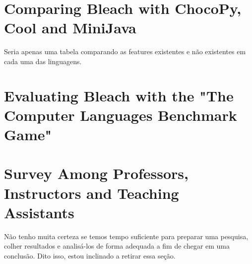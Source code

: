 \section{Comparing Bleach with ChocoPy, Cool and MiniJava}
Seria apenas uma tabela comparando as features existentes e não existentes em cada uma das linguagens.

\section{Evaluating Bleach with the "The Computer Languages Benchmark Game"}

\section{Survey Among Professors, Instructors and Teaching Assistants}
Não tenho muita certeza se temos tempo suficiente para preparar uma pesquisa, colher resultados e analisá-los de forma adequada a fim de chegar em uma conclusão. Dito isso, estou inclinado a retirar essa seção.